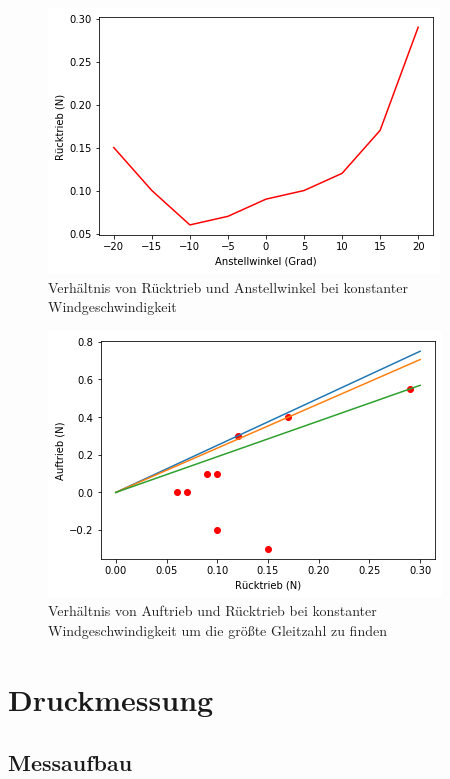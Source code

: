 \begin{figure}
    \centering
    \includegraphics[scale=0.8]{Aeromechanik/Protokoll/fig/Aeromechanik Versuch 3.12.png}
    \caption{Verhältnis von Rücktrieb und Anstellwinkel bei konstanter Windgeschwindigkeit}
    \label{fig:Aeromechanik Versuch 3.12}
\end{figure}

\begin{figure}
    \centering
    \includegraphics[scale=0.8]{Aeromechanik/Protokoll/fig/Aeromechanik Versuch 3.13.png}
    \caption{Verhältnis von Auftrieb und Rücktrieb bei konstanter Windgeschwindigkeit um die größte Gleitzahl zu finden}
    \label{fig:Aeromechanik Versuch 3.13}
\end{figure}

\section{Druckmessung}
\subsection{Messaufbau}